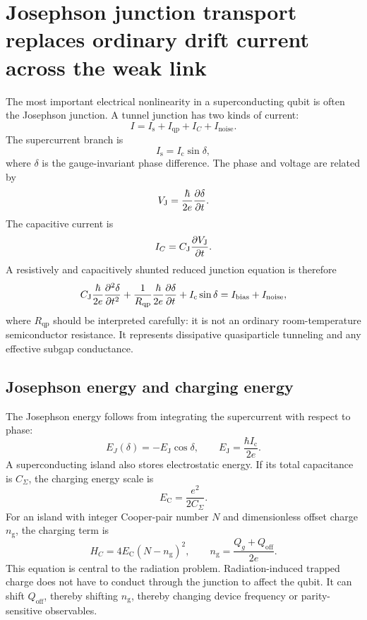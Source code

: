 \documentclass[11pt]{article}
\newcommand{\Ic}{I_{\mathrm{c}}}
\newcommand{\VJ}{V_{\mathrm{J}}}
\newcommand{\CJ}{C_{\mathrm{J}}}
\newcommand{\EJ}{E_{\mathrm{J}}}
\newcommand{\EC}{E_{\mathrm{C}}}
\newcommand{\ngate}{n_{\mathrm{g}}}
\newcommand{\Qoff}{Q_{\mathrm{off}}}
\newcommand{\hbarTwoe}{\frac{\hbar}{2e}}
\begin{document}
\section{Josephson junction transport replaces ordinary drift current across the weak link}

The most important electrical nonlinearity in a superconducting qubit is often the Josephson junction. A tunnel junction has two kinds of current:
\begin{equation}
I = I_{\mathrm{s}} + I_{\mathrm{qp}} + I_C + I_{\mathrm{noise}}.
\end{equation}
The supercurrent branch is
\begin{equation}
I_{\mathrm{s}}=\Ic\sin\delta,
\label{eq:josephson_current}
\end{equation}
where \(\delta\) is the gauge-invariant phase difference. The phase and voltage are related by
\begin{equation}
\VJ = \hbarTwoe\pdv{\delta}{t}.
\label{eq:josephson_voltage}
\end{equation}
The capacitive current is
\begin{equation}
I_C=\CJ\pdv{\VJ}{t}.
\end{equation}
A resistively and capacitively shunted reduced junction equation is therefore
\begin{equation}
\CJ\hbarTwoe\pdv[2]{\delta}{t}+\frac{1}{R_{\mathrm{qp}}}\hbarTwoe\pdv{\delta}{t}+\Ic\sin\delta=I_{\mathrm{bias}}+I_{\mathrm{noise}},
\label{eq:rcsj}
\end{equation}
where \(R_{\mathrm{qp}}\) should be interpreted carefully: it is not an ordinary room-temperature semiconductor resistance. It represents dissipative quasiparticle tunneling and any effective subgap conductance.

\subsection{Josephson energy and charging energy}

The Josephson energy follows from integrating the supercurrent with respect to phase:
\begin{equation}
E_J(\delta) = -\EJ\cos\delta,\qquad \EJ=\frac{\hbar\Ic}{2e}.
\end{equation}
A superconducting island also stores electrostatic energy. If its total capacitance is \(C_\Sigma\), the charging energy scale is
\begin{equation}
\EC=\frac{e^2}{2C_\Sigma}.
\end{equation}
For an island with integer Cooper-pair number \(N\) and dimensionless offset charge \(\ngate\), the charging term is
\begin{equation}
H_C = 4\EC (N-\ngate)^2,
\qquad
\ngate = \frac{Q_g+\Qoff}{2e}.
\label{eq:charging}
\end{equation}
This equation is central to the radiation problem. Radiation-induced trapped charge does not have to conduct through the junction to affect the qubit. It can shift \(\Qoff\), thereby shifting \(\ngate\), thereby changing device frequency or parity-sensitive observables.
\end{document}
